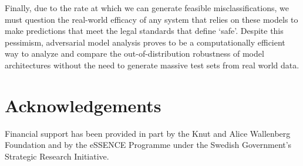 \documentclass[lettersize,journal]{IEEEtran}
\begin{document}
Finally, due to the rate at which we can generate feasible misclassifications, we must question the real-world efficacy of any system that relies on these models to make predictions that meet the legal standards that define `safe'. Despite this pessimism, adversarial model analysis proves to be a computationally efficient way to analyze and compare the out-of-distribution robustness of model architectures without the need to generate massive test sets from real world data.

\section{Acknowledgements}
Financial support has been provided in part by the Knut and Alice Wallenberg Foundation and by the eSSENCE Programme under the Swedish Government’s Strategic Research Initiative. 



\begin{thebibliography}

\end{thebibliography}
\end{document}
